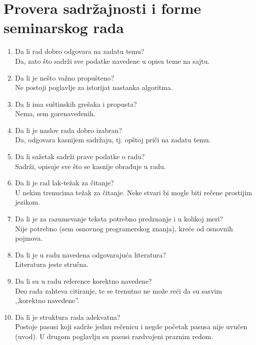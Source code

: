 \documentclass[a4paper]{report}
\begin{document}
\section{Provera sadržajnosti i forme seminarskog rada}

\begin{enumerate}
\item Da li rad dobro odgovara na zadatu temu?\\
Da, zato što sadrži sve podatke navedene u opisu teme na sajtu. 

\item Da li je nešto važno propušteno?\\
Ne postoji poglavlje za istorijat nastanka algoritma.

\item Da li ima suštinskih grešaka i propusta?\\
Nema, sem gorenavedenih.

\item Da li je naslov rada dobro izabran?\\
Da, odgovara kasnijem sadržaju, tj. opštoj priči na zadatu temu. 

\item Da li sažetak sadrži prave podatke o radu?\\
Sadrži, opisuje sve što se kasnije obrađuje u radu.

\item Da li je rad lak-težak za čitanje?\\
U nekim trenucima težak za čitanje. Neke stvari bi mogle biti rečene prostijim jezikom. 

\item Da li je za razumevanje teksta potrebno predznanje i u kolikoj meri?\\
Nije potrebno (sem osnovnog programerskog znanja), kreće od osnovnih pojmova. 

\item Da li je u radu navedena odgovarajuća literatura?\\
Literatura jeste stručna.

\item Da li su u radu reference korektno navedene?\\
Deo rada zahteva citiranje, te se trenutno ne može reći da su sasvim ,,korektno navedene''.

\item Da li je struktura rada adekvatna?\\
Postoje pasusi koji sadrže jednu rečenicu i negde početak pasusa nije uvučen (uvod). U drugom poglavlju su pasusi razdvojeni praznim redom.


\end{enumerate}
\end{document}
